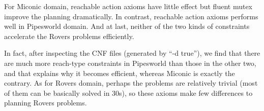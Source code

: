 \documentclass{article}
\begin{document}
For Miconic domain, reachable action axioms have little effect but fluent mutex improve the planning dramatically. In contrast, reachable action axioms performs well in Pipesworld domain. And at last, neither of the two kinds of constraints accelerate the Rovers problems efficiently.

In fact, after inspecting the CNF files (generated by ``-d true''), we find that there are much more reach-type constraints in Pipesworld than those in the other two, and that explains why it becomes efficient, whereas Miconic is exactly the contrary. As for Rovers domain, perhaps the problems are relatively trivial (most of them can be basically solved in 30s), so these axioms make few differences to planning Rovers problems.
\end{document}
